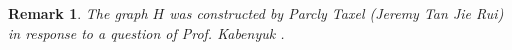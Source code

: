 \documentclass[12pt,a4paper]{article}
\theoremstyle{plain}
\newtheorem{cor}{Corollary}[section]
\newtheorem{remark}{Remark}[section]
\begin{document}
\begin{remark}
The graph $H$ was constructed by Parcly Taxel (Jeremy Tan Jie Rui) in response to a question of Prof. Kabenyuk \cite{Kabenyuk:2023:pentagons,Kabenyuk:2024:MinimalPentagulations}.
\end{remark}
%
%
%
%
%
%
%
%
%
\end{document}
